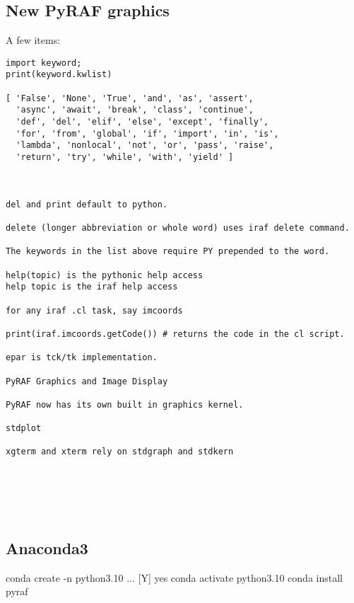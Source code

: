 \subsection{New PyRAF graphics}


A few items:

\begingroup \fontsize{10pt}{10pt}
\selectfont
\begin{verbatim} 
import keyword;
print(keyword.kwlist)

[ 'False', 'None', 'True', 'and', 'as', 'assert', 
  'async', 'await', 'break', 'class', 'continue', 
  'def', 'del', 'elif', 'else', 'except', 'finally', 
  'for', 'from', 'global', 'if', 'import', 'in', 'is', 
  'lambda', 'nonlocal', 'not', 'or', 'pass', 'raise', 
  'return', 'try', 'while', 'with', 'yield' ]



del and print default to python.

delete (longer abbreviation or whole word) uses iraf delete command.

The keywords in the list above require PY prepended to the word.

help(topic) is the pythonic help access
help topic is the iraf help access

for any iraf .cl task, say imcoords

print(iraf.imcoords.getCode()) # returns the code in the cl script.

epar is tck/tk implementation.

PyRAF Graphics and Image Display

PyRAF now has its own built in graphics kernel.

stdplot

xgterm and xterm rely on stdgraph and stdkern






\end{verbatim}
\endgroup


\subsection{Anaconda3}


conda create -n python3.10
... [Y] yes
conda activate python3.10
conda install pyraf


%

